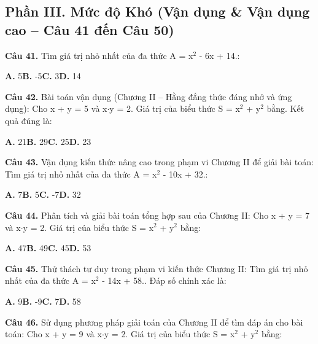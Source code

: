 \documentclass[11pt,a4paper]{article}
\begin{document}
\subsection*{\color{accent} Phần III. Mức độ Khó (Vận dụng \& Vận dụng cao -- Câu 41 đến Câu 50)}
\textbf{\color{primary} Câu 41.} Tìm giá trị nhỏ nhất của đa thức A = x$^2$ - 6x + 14.:\par
\hspace*{1.5em}\textbf{A.} 5\quad\quad \textbf{B.} -5\quad\quad \textbf{C.} 3\quad\quad \textbf{D.} 14\par\vspace{2pt}
\textbf{\color{primary} Câu 42.} Bài toán vận dụng (Chương II – Hằng đẳng thức đáng nhớ và ứng dụng): Cho x + y = 5 và x$\cdot$y = 2. Giá trị của biểu thức S = x$^2$ + y$^2$ bằng. Kết quả đúng là:\par
\hspace*{1.5em}\textbf{A.} 21\quad\quad \textbf{B.} 29\quad\quad \textbf{C.} 25\quad\quad \textbf{D.} 23\par\vspace{2pt}
\textbf{\color{primary} Câu 43.} Vận dụng kiến thức nâng cao trong phạm vi Chương II để giải bài toán: Tìm giá trị nhỏ nhất của đa thức A = x$^2$ - 10x + 32.:\par
\hspace*{1.5em}\textbf{A.} 7\quad\quad \textbf{B.} 5\quad\quad \textbf{C.} -7\quad\quad \textbf{D.} 32\par\vspace{2pt}
\textbf{\color{primary} Câu 44.} Phân tích và giải bài toán tổng hợp sau của Chương II: Cho x + y = 7 và x$\cdot$y = 2. Giá trị của biểu thức S = x$^2$ + y$^2$ bằng:\par
\hspace*{1.5em}\textbf{A.} 47\quad\quad \textbf{B.} 49\quad\quad \textbf{C.} 45\quad\quad \textbf{D.} 53\par\vspace{2pt}
\textbf{\color{primary} Câu 45.} Thử thách tư duy trong phạm vi kiến thức Chương II: Tìm giá trị nhỏ nhất của đa thức A = x$^2$ - 14x + 58.. Đáp số chính xác là:\par
\hspace*{1.5em}\textbf{A.} 9\quad\quad \textbf{B.} -9\quad\quad \textbf{C.} 7\quad\quad \textbf{D.} 58\par\vspace{2pt}
\textbf{\color{primary} Câu 46.} Sử dụng phương pháp giải toán của Chương II để tìm đáp án cho bài toán: Cho x + y = 9 và x$\cdot$y = 2. Giá trị của biểu thức S = x$^2$ + y$^2$ bằng:\par
\end{document}
